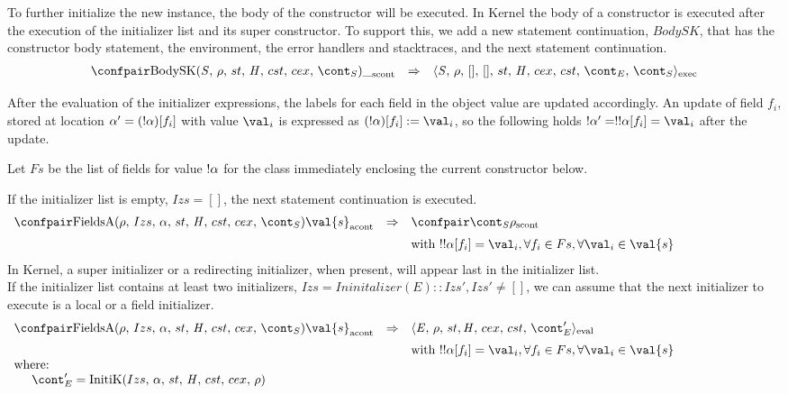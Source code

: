 \documentclass{article}
\begin{document}
\noindent
To further initialize the new instance, the body of the constructor will be executed.
In Kernel the body of a constructor is executed after the execution of the initializer list and its super constructor.
\noindent
To support this, we add a new statement continuation, $BodySK$, that has the constructor body statement, the environment, the error handlers and stacktraces, and the next statement continuation.
\[
  \begin{array}{lcl}
	\scontconf{\BodySK{\stmt}{\env}{\scont}}{\_}
	& \Rightarrow &
	\execconf{\stmt}{\env}{[]}{[]}{\handler}{\cex}{\cstrace}{\econt}{\scont}
  \end{array}
\]

\noindent
After the evaluation of the initializer expressions, the labels for each field in the object value are updated accordingly.
An update of field $f_i$, stored at location $\alpha' = (!\alpha)[f_i]$ with value $\val_i$ is expressed as $\update{(\deref{\loc})[f_i]}{\val_{i}}$, so the following holds $\deref{\loc'} = \deref{\deref{\loc[f_i]}} = \val_{i}$ after the update.

\noindent
Let $Fs$ be the list of fields for value $!\alpha$ for the class immediately enclosing the current constructor below.

If the initializer list is empty, $Izs = []$, the next statement continuation is executed.
\[
  \begin{array}{lcl@{\hspace{30mm}}}
	\acontconf{\FieldsA{\env}{Izs}{\loc}{\scont}}{\val{s}}
	& \Rightarrow &
	\scontconf{\scont}{\env}\\[2mm]
	&&\textrm{with }\deref{\deref\loc[f_i]} = \val_{i}, \forall f_i \in Fs, \forall \val_i \in \val{s}
  \end{array}
\]
\noindent
In Kernel, a super initializer or a redirecting initializer, when present, will appear last in the initializer list.\\
If the initializer list contains at least two initializers, $Izs = Ininitalizer(E) :: Izs', Izs' \neq []$, we can assume that the next initializer to execute is a local or a field initializer.
\[
  \begin{array}{lcl@{\hspace{30mm}}}
	\acontconf{\FieldsA{\env}{Izs}{\loc}{\scont}}{\val{s}}
	& \Rightarrow &
	\evalconf{\expr}{\env}{st}{cex}{cst}{\econt'}\\[2mm]
	&&\textrm{with }\deref{\deref{\loc[f_i]}} = \val_{i}, \forall f_i \in Fs, \forall \val_i \in \val{s}\\
	\textrm{where:}\\
	\hspace{5mm}\econt' = \InitK{Izs}{\loc}{\env}
  \end{array}
\]
\end{document}
